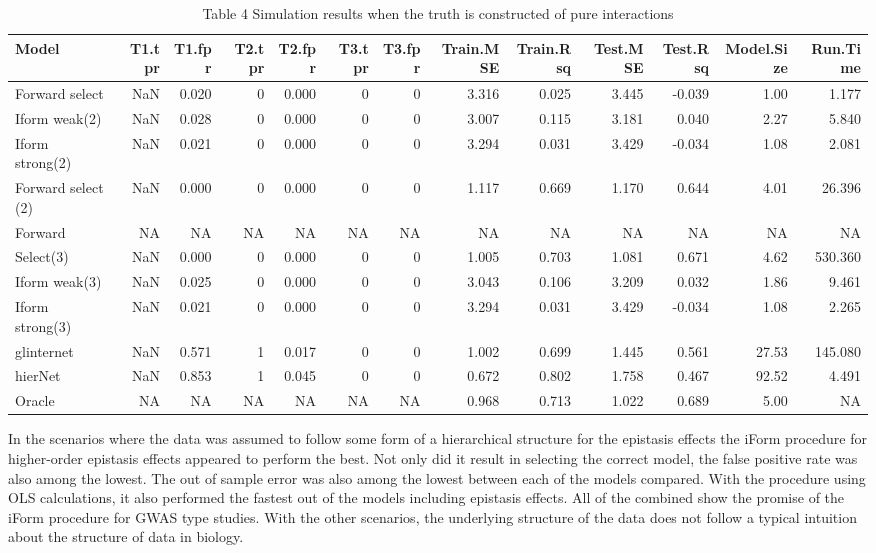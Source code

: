 \documentclass[11pt,]{book}
\theoremstyle{definition}
\theoremstyle{definition}
\theoremstyle{remark}
\begin{document}
\begin{table}

\caption{\label{tab:Chap3sim4}Table 4 Simulation results when the truth is constructed of pure interactions}
\centering
\begin{tabular}[t]{lrrrrrrrrrrrr}
\toprule
Model & T1.tpr & T1.fpr & T2.tpr & T2.fpr & T3.tpr & T3.fpr & Train.MSE & Train.Rsq & Test.MSE & Test.Rsq & Model.Size & Run.Time\\
\midrule
Forward select & NaN & 0.020 & 0 & 0.000 & 0 & 0 & 3.316 & 0.025 & 3.445 & -0.039 & 1.00 & 1.177\\
Iform weak(2) & NaN & 0.028 & 0 & 0.000 & 0 & 0 & 3.007 & 0.115 & 3.181 & 0.040 & 2.27 & 5.840\\
Iform strong(2) & NaN & 0.021 & 0 & 0.000 & 0 & 0 & 3.294 & 0.031 & 3.429 & -0.034 & 1.08 & 2.081\\
Forward select (2) & NaN & 0.000 & 0 & 0.000 & 0 & 0 & 1.117 & 0.669 & 1.170 & 0.644 & 4.01 & 26.396\\
Forward & NA & NA & NA & NA & NA & NA & NA & NA & NA & NA & NA & NA\\
\addlinespace
Select(3) & NaN & 0.000 & 0 & 0.000 & 0 & 0 & 1.005 & 0.703 & 1.081 & 0.671 & 4.62 & 530.360\\
Iform weak(3) & NaN & 0.025 & 0 & 0.000 & 0 & 0 & 3.043 & 0.106 & 3.209 & 0.032 & 1.86 & 9.461\\
Iform strong(3) & NaN & 0.021 & 0 & 0.000 & 0 & 0 & 3.294 & 0.031 & 3.429 & -0.034 & 1.08 & 2.265\\
glinternet & NaN & 0.571 & 1 & 0.017 & 0 & 0 & 1.002 & 0.699 & 1.445 & 0.561 & 27.53 & 145.080\\
hierNet & NaN & 0.853 & 1 & 0.045 & 0 & 0 & 0.672 & 0.802 & 1.758 & 0.467 & 92.52 & 4.491\\
Oracle & NA & NA & NA & NA & NA & NA & 0.968 & 0.713 & 1.022 & 0.689 & 5.00 & NA\\
\bottomrule
\end{tabular}
\end{table}

In the scenarios where the data was assumed to follow some form of a
hierarchical structure for the epistasis effects the iForm procedure for
higher-order epistasis effects appeared to perform the best. Not only
did it result in selecting the correct model, the false positive rate
was also among the lowest. The out of sample error was also among the
lowest between each of the models compared. With the procedure using OLS
calculations, it also performed the fastest out of the models including
epistasis effects. All of the combined show the promise of the iForm
procedure for GWAS type studies. With the other scenarios, the
underlying structure of the data does not follow a typical intuition
about the structure of data in biology.
\end{document}
